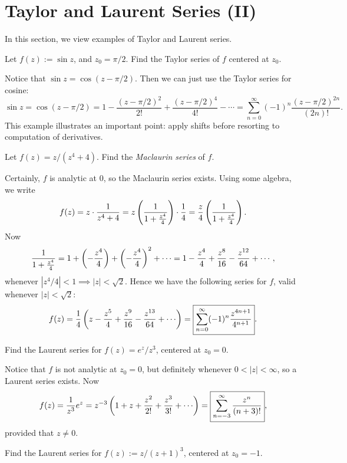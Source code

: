 \documentclass{article}
\begin{document}
\section{Taylor and Laurent Series (II)}
In this section, we view examples of Taylor and Laurent series.
\begin{example}
Let $f(z) := \sin z$, and $z_0 = \pi/2$. Find the Taylor series of $f$ centered at $z_0$.
\end{example}
\begin{solution}
Notice that $\sin z = \cos(z-\pi/2)$. Then we can just use the Taylor series for cosine:
$$\sin z = \cos(z-\pi/2) = 1 - \frac{(z-\pi/2)^2}{2!} + \frac{(z-\pi/2)^4}{4!} - \cdots = \boxed{\sum_{n=0}^\infty (-1)^n \frac{(z-\pi/2) ^{2n}}{(2n)!}}.$$
This example illustrates an important point: apply shifts before resorting to computation of derivatives.
\end{solution}
\begin{example}
Let $f(z) = z/(z^4+4)$. Find the \textit{Maclaurin series} of $f$.
\end{example}
\begin{solution}
Certainly, $f$ is analytic at $0$, so the Maclaurin series exists. Using some algebra, we write
$$f(z) = z\cdot \frac 1{z^4+4} = z\left(\frac 1{1 + \frac{z^4}4} \right)\cdot \frac 14 = \frac z4\left(\frac 1{1 + \frac{z^4}4} \right).$$
Now
$$\frac 1{1 + \frac{z^4}4} = 1 + \left(-\frac{z^4}4 \right) + \left(-\frac{z^4}4 \right)^2 + \cdots = 1- \frac{z^4}4 + \frac{z^8}{16} - \frac{z^{12}}{64} + \cdots,$$
whenever $|z^4/4|< 1 \implies |z|<\sqrt 2$. Hence we have the following series for $f$, valid whenever $|z|<\sqrt 2$:
$$f(z) = \frac 14\paren{z - \frac{z^5}4 + \frac{z^9}{16} - \frac{z^{13}}{64} + \cdots} = \boxed{ \sum_{n=0}^ \infty (-1)^n\frac{z^{4n+1}}{4^{n+1}}}.$$
\end{solution}
\begin{example}
Find the Laurent series for $f(z) = e^z/z^3$, centered at $z_0 = 0$.
\end{example}
\begin{solution}
Notice that $f$ is not analytic at $z_0=0$, but definitely whenever $0 < |z| < \infty$, so a Laurent series exists. Now
$$f(z) = \frac 1{z^3}e^z = z^{-3}\paren{1 + z + \frac{z^2}{2!} + \frac{z^3}{3!}+\cdots} = \boxed{\sum_{n=-3}^\infty \frac{z^n}{(n+3)!}},$$
provided that $z\neq 0$.
\end{solution}
\begin{example}
Find the Laurent series for $f(z):= z/(z+1)^3$, centered at $z_0 = -1$.
\end{example}
\end{document}
